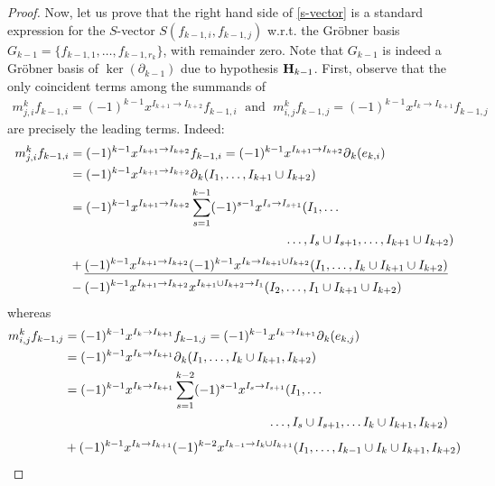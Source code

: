 \documentclass[ALCO]{cedram}
\newcommand{\mbfh}{\mbox{${\bf H}$}}
\newcommand{\dif}{\mbox{$\partial$}}
\begin{document}
\begin{proof}
Now, let us prove that the right hand side of \eqref{s-vector} is a
standard expression for the $S$-vector $S(f_{k-1,i},f_{k-1,j})$
w.r.t. the Gr\"obner basis $G_{k-1}=\{f_{k-1,1},\ldots
,f_{k-1,r_{k}}\}$, with remainder zero. Note that $G_{k-1}$ is indeed
a Gr\"obner basis of $\ker(\dif_{k-1})$ due to hypothesis
$\mbfh_{k-1}$.  First, observe that the only coincident terms among
the summands of
\begin{eqnarray*}
m^{k}_{j,i}f_{k-1,i}=(-1)^{k-1}x^{I_{k+1}\to I_{k+2}}f_{k-1,i}\;\mbox{ and }\;
m^{k}_{i,j}f_{k-1,j}=(-1)^{k-1}x^{I_{k}\to I_{k+1}}f_{k-1,j}
\end{eqnarray*}
are precisely the leading terms. Indeed: 
\begin{align}\label{fi}
m^{k}_{j,i}f_{k-1,i}&=(-1)^{k-1}x^{I_{k+1}\to
  I_{k+2}}f_{k-1,i}=(-1)^{k-1}x^{I_{k+1}\to
  I_{k+2}}\dif_{k}(e_{k,i})\notag \\ 
&= (-1)^{k-1}x^{I_{k+1}\to
  I_{k+2}}\dif_{k}(I_1,\ldots ,I_{k+1}\cup
I_{k+2}) \notag \\
&= (-1)^{k-1}x^{I_{k+1}\to
  I_{k+2}}\sum_{s=1}^{k-1}(-1)^{s-1}x^{I_s\to I_{s+1}}(I_1,\ldots\\
&\phantom{(-1)^{k-1}x^{I_{k+1}\to
  I_{k+2}}\lim_{s=1}(-1)^{s-1}x^{I_s\to I_{s+1}}}\dots,I_s\cup I_{s+1},\ldots ,I_{k+1}\cup I_{k+2})\notag
\\
&+ \underline{(-1)^{k-1}x^{I_{k+1}\to I_{k+2}}(-1)^{k-1}x^{I_{k}\to
    I_{k+1}\cup I_{k+2}}(I_1,\ldots ,I_{k}\cup I_{k+1}\cup
  I_{k+2})}\notag \\ 
& -(-1)^{k-1}x^{I_{k+1}\to I_{k+2}}x^{I_{k+1}\cup I_{k+2}\to
  I_1}(I_2,\ldots,I_1\cup I_{k+1}\cup I_{k+2})\notag
\end{align}
whereas 
\begin{align}\label{fj}
 m^{k}_{i,j}f_{k-1,j}&=(-1)^{k-1}x^{I_{k}\to I_{k+1}}f_{k-1,j}=
  (-1)^{k-1}x^{I_{k}\to I_{k+1}}\dif_{k}(e_{k,j}) \notag \\ 
&=  (-1)^{k-1}x^{I_{k}\to I_{k+1}}\dif_{k}(I_1,\ldots ,I_{k}\cup
  I_{k+1},I_{k+2}) \notag \\
&= (-1)^{k-1}x^{I_{k}\to
    I_{k+1}}\sum_{s=1}^{k-2}(-1)^{s-1}x^{I_s\to I_{s+1}}(I_1,\ldots
  \\
	&\phantom{(-1)^{k-1}x^{I_{k}\to
    I_{k+1}}\lim_{s=1}(-1)^{s-1}x^{I_s\to I_{s+1}}}\ldots, I_s\cup I_{s+1}, \dots I_{k}\cup I_{k+1}, I_{k+2})\notag\\ 
&+  (-1)^{k-1}x^{I_{k}\to I_{k+1}}(-1)^{k-2}x^{I_{k-1}\to I_{k}\cup
    I_{k+1}} (I_1,\ldots , I_{k-1}\cup I_{k}\cup I_{k+1}, I_{k+2})\notag
 \\

\end{align}
\end{proof}
\end{document}
